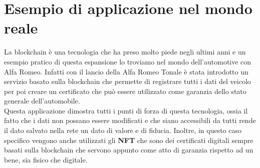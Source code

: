 \section{Esempio di applicazione nel mondo reale}
La blockchain è una tecnologia che ha preso molto piede negli ultimi anni e 
un esempio pratico di questa espansione lo troviamo nel mondo dell'automotive
con Alfa Romeo. Infatti con il lancio della Alfa Romeo Tonale è stata introdotto
un servizio basato sulla blockchain che permette di registrare tutti i dati del
veicolo per poi creare un certificato che può essere utilizzato come garanzia 
dello stato generale dell'automobile. \\
Questa applicazione dimostra tutti i punti di forza di questa tecnologia, ossia
il fatto che i dati non possano essere modificati e che siano accessibili da
tutti rende il dato salvato nella rete un dato di valore e di fiducia. Inoltre, 
in questo caso specifico vengono anche utilizzati gli \textbf{NFT} che sono
dei certificati digitali sempre basati sulla blockchain che servono appunto
come atto di garanzia rispetto ad un bene, sia fisico che
digitale.\texttt{}\cite{alfaRomeoBlockchain}


